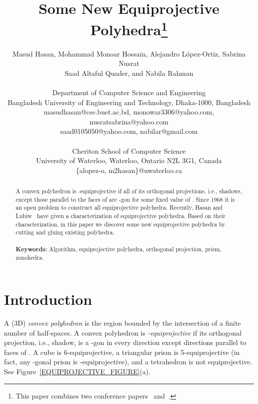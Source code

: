 \documentclass{article}
\title{Some New Equiprojective Polyhedra\thanks{This paper combines two conference papers~\cite{HHNL08}
and~\cite{RQH06}.}}
\author{Masud Hasan, Mohammad Monoar Hossain, Alejandro L\'opez-Ortiz, Sabrina Nusrat\\
Saad Altaful Quader, and Nabila Rahman\\
\\
 Department of Computer Science and Engineering\\
Bangladesh University of Engineering and Technology, Dhaka-1000, Bangladesh\\
masudhasan@cse.buet.ac.bd, monowar3306@yahoo.com, nusratsabrina@yahoo.com\\
saad0105050@yahoo.com, nabilar@gmail.com\\
\\
 Cheriton School of Computer Science\\
University of Waterloo, Waterloo, Ontario N2L 3G1, Canada\\
\{alopez-o, m2hasan\}@uwaterloo.ca}
\date{}
\begin{document}
\maketitle

\begin{abstract}
A convex polyhedron  is -equiprojective if all of its orthogonal projections,
i.e., shadows, except those parallel to the faces of  are -gon for 
some fixed value of .
Since 1968 it is an open problem to construct all equiprojective polyhedra.
Recently, Hasan and Lubiw~\cite{HL08} have given a characterization of equiprojective polyhedra.
Based on their characterization, in this paper we discover some new equiprojective polyhedra
by cutting and gluing existing polyhedra.\\
\\
{\bf Keywords:} Algorithm, equiprojective polyhedra, orthogonal projection, prism, zonohedra.
\end{abstract}

\section{Introduction}
A (3D) \emph{convex polyhedron} is the region bounded by the 
intersection of a finite number of half-spaces. A convex polyhedron  is {\it -equiprojective\/} if 
its orthogonal projection, i.e., shadow, 
is a -gon in every direction except directions parallel to faces of .
A cube is 6-equiprojective, a triangular prism is 5-equiprojective
(in fact, any -gonal prism is -equiprojective), and
a tetrahedron is not equiprojective. 
See Figure~\ref{EQUIPROJECTIVE_FIGURE}(a).
\end{document}
